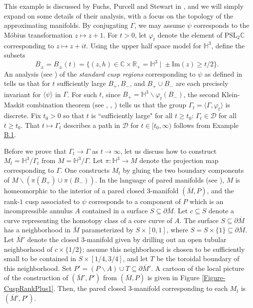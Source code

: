 \documentclass[11pt,leqno]{article}
\theoremstyle{introdef}
\numberwithin{lemma}{section}
\theoremstyle{definition}
\newcommand{\C}{\mathbb{C}}
\begin{document}
This example is discussed  by Fuchs, Purcell and Stewart in \cite[Section 4]{PUR}, and we will simply expand on some details of their analysis, with a focus on the topology of the approximating manifolds. By conjugating $\Gamma$, we may assume $\psi$ corresponds to the M\"{o}bius transformation $z\mapsto z+1$. For $t>0$, let $\varphi_t$ denote the element of $\mathrm{PSL}_2\C$ corresponding to $z\mapsto z+it$. Using the upper half space model for $\mathbb{H}^3$, define the subsets \[B_{\pm}=B_{\pm}(t)=\{(z,h)\in\C\times\mathbb{R}_+=\mathbb{H}^3\;|\;\pm\mathrm{Im}(z)\geq t/2\}.\] An analysis (see \cite{PUR}) of the \textit{standard cusp regions} corresponding to $\psi$ as defined in \cite{BOWGF} tells us that for $t$ sufficiently large $B_+,B_-$, and $B_+\cup B_-$ are each precisely invariant for $\langle \psi\rangle$ in $\Gamma$. For such $t$, since $B_+=\overline{\mathbb{H}^3\backslash \varphi_t(B_-)}$, the second Klein-Maskit combination theorem (see \cite{MAT}, \cite{MASK}, \cite{ABI}) tells us that the group $\Gamma_t=\langle\Gamma,\varphi_t\rangle$ is discrete. Fix $t_0>0$ so that $t$ is ``sufficiently large" for all $t\geq t_0$: $\Gamma_t\in\mathcal{D}$ for all $t\geq t_0$. That $t\mapsto\Gamma_t$ describes a path in $\mathcal{D}$ for $t\in[t_0,\infty)$ follows from Example \hyperlink{Ex-QCDef}{B.1}. \par

Before we prove that $\Gamma_t\rightarrow\Gamma$ as $t\rightarrow\infty$, let us discuss how to construct $M_t=\mathbb{H}^3/\Gamma_t$ from $M=\mathbb{H}^3/\Gamma$. Let $\pi:\mathbb{H}^3\rightarrow M$ denote the projection map corresponding to $\Gamma$. One constructs $M_t$ by gluing the two boundary components of $M\backslash(\pi(B_+)\cup\pi(B_-))$. In the language of pared manifolds (see \cite[Section 7]{THUI}), $M$ is homeomorphic to the interior of a pared closed $3$-manifold $(\overline{M},P)$, and the rank-$1$ cusp associated to $\psi$ corresponds to a component of $P$ which is an incompressible annulus $A$ contained in a surface $S\subseteq\partial\overline{M}$. Let $c\subseteq S$ denote a curve representing the homotopy class of a core curve of $A$. The surface $S\subseteq\partial\overline{M}$ has a neighborhood in $\overline{M}$ parameterized by $S\times[0,1]$, where $S=S\times\{1\}\subseteq\partial\overline{M}$. Let $\overline{M}'$ denote the closed $3$-manifold given by drilling out an open tubular neighborhood of $c\times\{1/2\}$; assume this neighborhood is chosen to be sufficiently small to be contained in $S\times[1/4,3/4]$, and let $T$ be the toroidal boundary of this neighborhood. Set $P'=(P\backslash A)\cup T\subseteq\partial\overline{M}'$. A cartoon of the local picture of the construction of $(\overline{M}',P')$ from $(\overline{M},P)$ is given in Figure \ref{Figure-CuspRankPlus1}. Then, the pared closed $3$-manifold corresponding to each $M_t$ is $(\overline{M}',P')$.\par
\end{document}
